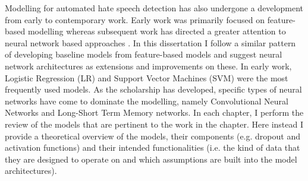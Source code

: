 Modelling for automated hate speech detection has also undergone a development from early to contemporary work. 
Early work was primarily focused on feature-based modelling \citep[e.g.][]{Waseem-Hovy:2016,Waseem:2016,Davidson:2017,Sahlgren:2018} whereas subsequent work has directed a greater attention to neural network based approaches \citep[e.g.][]{Kolhatkar:2020,Waseem:2018,Gamback:2017,Badjatiya:2017}. 
In this dissertation I follow a similar pattern of developing baseline models from feature-based models and suggest neural network architectures as extensions and improvements on these. 
In early work, Logistic Regression (LR) and Support Vector Machines (SVM) were the most frequently used models.
As the scholarship has developed, specific types of neural networks have come to dominate the modelling, namely Convolutional Neural Networks and Long-Short Term Memory networks.
In each chapter, I perform the review of the models that are pertinent to the work in the chapter. 
Here instead I provide a theoretical overview of the models, their components (e.g. dropout and activation functions) and their intended functionalities (i.e. the kind of data that they are designed to operate on and which assumptions are built into the model architectures).

